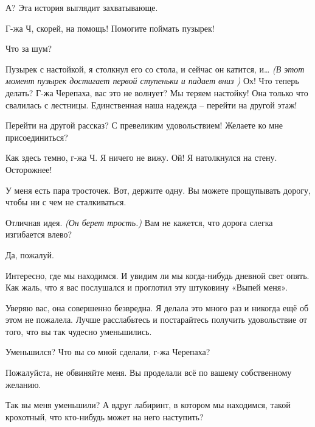 \documentclass[../main.tex]{subfiles}
\begin{document}
\begin{Dialogue}
\begin{sublevel}
\begin{sublevel}

 А? Эта история выглядит захватывающе.

 Г-жа Ч, скорей, на помощь! Помогите поймать пузырек!

 Что за шум?

 Пузырек с настойкой, я столкнул его со стола, и сейчас он катится, и\ldots{} \emph{(В этот момент пузырек достигает первой ступеньки и падает вниз )} Ох! Что теперь делать? Г-жа Черепаха, вас это не волнует? Мы теряем настойку! Она только что свалилась с лестницы. Единственная наша надежда \--- перейти на другой этаж!

 Перейти на другой рассказ? С превеликим удовольствием! Желаете ко мне присоединиться?



\begin{sublevel}


 Как здесь темно, г-жа Ч\@. Я ничего не вижу. Ой! Я натолкнулся на стену. Осторожнее!

 У меня есть пара тросточек. Вот, держите одну. Вы можете прощупывать дорогу, чтобы ни с чем не сталкиваться.

 Отличная идея. \emph{(Он берет трость.)} Вам не кажется, что дорога слегка изгибается влево?

 Да, пожалуй.

 Интересно, где мы находимся. И увидим ли мы когда-нибудь дневной свет опять. Как жаль, что я вас послушался и проглотил эту штуковину «Выпей меня».

 Уверяю вас, она совершенно безвредна. Я делала это много раз и никогда ещё об этом не пожалела. Лучше расслабьтесь и постарайтесь получить удовольствие от того, что вы так чудесно уменьшились.

 Уменьшился? Что вы со мной сделали, г-жа Черепаха?

 Пожалуйста, не обвиняйте меня. Вы проделали всё по вашему собственному желанию.

 Так вы меня уменьшили? А вдруг лабиринт, в котором мы находимся, такой крохотный, что кто-нибудь может на него наступить?


\end{sublevel}
\end{sublevel}
\end{sublevel}
\end{Dialogue}
\end{document}
